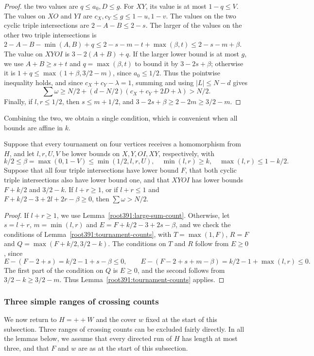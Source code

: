 \begin{proof}
the two values are $q\le a_0,D\le g$. For $XY$, its
value is at most $1-q\le V$. The values on $XO$ and $YI$
are $c_X,c_Y\le g\le1-u,1-v$.
The values on the two cyclic triple intersections are $2-A-B\le2-s$.
The larger of the values on the other two triple intersections is $2-A-B-\min(A,B)+q\le2-s-m-t+\max(\beta,t) \le2-s-m+\beta$. The value on $XYOI$ is $3-2(A+B)+q$. If the larger lower bound is at most $g$,
we use $A+B\ge s+t$ and $q=\max(\beta,t)$ to bound it by $3-2s+\beta$;
otherwise it is $1+q\le\max(1+\beta,3/2-m)$, since $a_0\le1/2$.
Thus the pointwise inequality holds, and since $c_X+c_Y-\lambda=1$,
summing and using $|L|\le N-d$ gives
\[
 \sum\omega\ge N/2+(d-N/2)(c_X+c_Y+2D+\lambda)>N/2.
\]
Finally, if $l,r\le1/2$, then $s\le m+1/2$, and
$3-2s+\beta\ge2-2m\ge3/2-m$.
\end{proof}

Combining the two, we obtain a single condition, which is convenient when all bounds are affine in $k$.

\begin{lemma}
\label{root391:scalar-count}\label{root406:scalar-count-part}
Suppose that every tournament on four vertices receives a homomorphism from $H$, and let $l,r,U,V$ be lower bounds on $X,Y,OI,XY$, respectively, with
\[
 k/2\le\beta=\max(0,1-V)\le\min(1/2,l,r,U),
 \quad\min(l,r)\ge k,\quad\max(l,r)\le1-k/2.
\]
Suppose that all four triple intersections have lower bound $F$, that both cyclic triple intersections
also have lower bound one, and that $XYOI$ has
lower bounds $F+k/2$ and $3/2-k$. If $l+r\ge1$, or if
$l+r\le1$ and $F+k/2-3+2l+2r-\beta\ge0$, then
$\sum\omega>N/2$.
\end{lemma}
\begin{proof}
If $l+r\ge1$, we use Lemma~\ref{root391:large-sum-count}. Otherwise,
let $s=l+r$, $m=\min(l,r)$ and
$E=F+k/2-3+2s-\beta$, and we check the conditions of Lemma~\ref{root391:tournament-counts}, with $T=\max(1,F)$, $R=F$ and $Q=\max(F+k/2,3/2-k)$. The conditions on $T$ and $R$ follow from $E\ge0$, since
\[
 E-(F-2+s)=k/2-1+s-\beta\le0,
 \qquad E-(F-2+s+m-\beta)=k/2-1+\max(l,r)\le0.
\]
The first part of the condition on $Q$ is $E\ge0$, and
the second follows from $3/2-k\ge3/2-m$. Thus Lemma~\ref{root391:tournament-counts} applies.
\end{proof}

\subsubsection{Three simple ranges of crossing counts}
We now return to $H=++W$ and the cover $w$ fixed at the start of this subsection. Three ranges of crossing counts can be excluded fairly directly.
In all the lemmas below, we assume that every directed run of $H$ has length at most three, and that $F$ and $w$ are as at the start of this subsection.

